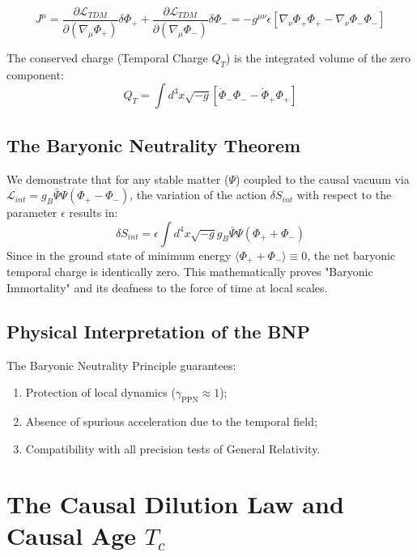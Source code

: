 \documentclass[12pt, a4paper]{article}
\begin{document}
\begin{equation}
J^\mu = \frac{\partial \mathcal{L}_{TDM}}{\partial (\nabla_\mu \Phi_+)} \delta \Phi_+ + \frac{\partial \mathcal{L}_{TDM}}{\partial (\nabla_\mu \Phi_-)} \delta \Phi_- = -g^{\mu\nu} \epsilon [\nabla_\nu \Phi_+ \Phi_+ - \nabla_\nu \Phi_- \Phi_-]
\end{equation}

The conserved charge (Temporal Charge \(Q_T\)) is the integrated volume of the zero component:
\begin{equation}
Q_T = \int d^3x \sqrt{-g} [\dot{\Phi}_- \Phi_- - \dot{\Phi}_+ \Phi_+]
\end{equation}

\subsection{The Baryonic Neutrality Theorem}
We demonstrate that for any stable matter (\(\Psi\)) coupled to the causal vacuum via \(\mathcal{L}_{int} = g_B \bar{\Psi}\Psi (\Phi_+ - \Phi_-)\), the variation of the action \(\delta S_{int}\) with respect to the parameter \(\epsilon\) results in:
\begin{equation}
\delta S_{int} = \epsilon \int d^4x \sqrt{-g} g_B \bar{\Psi}\Psi (\Phi_+ + \Phi_-)
\end{equation}
Since in the ground state of minimum energy \(\langle \Phi_+ + \Phi_- \rangle \equiv 0\), the net baryonic temporal charge is identically zero. This mathematically proves "Baryonic Immortality" and its deafness to the force of time at local scales.

\subsection{Physical Interpretation of the BNP}
The Baryonic Neutrality Principle guarantees:
\begin{enumerate}
    \item Protection of local dynamics (\(\gamma_{\text{PPN}} \approx 1\));
    \item Absence of spurious acceleration due to the temporal field;
    \item Compatibility with all precision tests of General Relativity.
\end{enumerate}

\section{The Causal Dilution Law and Causal Age \texorpdfstring{\(T_c\)}{Tc}}
\end{document}
